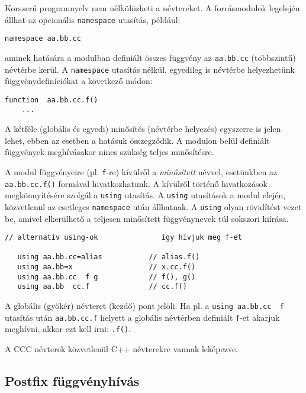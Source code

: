 Korszerű programnyelv nem nélkülözheti a névtereket.
A forrásmodulok legelején állhat az opcionális 
\verb!namespace! utasítás, például:
\begin{verbatim}
namespace aa.bb.cc
\end{verbatim}
aminek hatására a modulban definiált összes függvény
az \verb!aa.bb.cc! (többszintű) névtérbe kerül.
A \verb!namespace! utasítás nélkül, egyedileg is névtérbe 
helyezhetünk függvénydefiníciókat a következő módon:
\begin{verbatim}
function  aa.bb.cc.f()
    ...
\end{verbatim}
A kétféle (globális és egyedi) minősítés (névtérbe helyezés) 
egyszerre is jelen lehet, ebben az esetben a hatásuk összegződik.
A modulon belül definiált függvények meghívásakor
nincs szükség teljes minősítésre.

A modul függvényeire (pl. \verb!f!-re) kívülről a {\em minősített\/} névvel,
esetünkben az \verb!aa.bb.cc.f()! formával hivatkozhatunk.
A kívülről történő hivatkozások megkönnyítésére szolgál a \verb!using! utasítás.
A \verb!using! utasítások a modul elején, közvetlenül az
esetleges \verb!namespace! után állhatnak. A \verb!using! olyan 
rövidítést vezet be, amivel elkerülhető a teljesen minősített 
függvénynevek túl sokszori kiírása.

\begin{verbatim}
// alternatív using-ok               így hívjuk meg f-et

   using aa.bb.cc=alias           // alias.f()
   using aa.bb=x                  // x.cc.f()
   using aa.bb.cc  f g            // f(), g()
   using aa.bb  cc.f              // cc.f()
\end{verbatim}

A globális (gyökér) névteret (kezdő) pont jelöli. 
Ha pl. a \verb!using aa.bb.cc  f! utasítás után 
\verb!aa.bb.cc.f! helyett a globális névtérben definiált 
\verb!f!-et akarjuk meghívni, akkor ezt kell irni: \verb!.f()!.

A CCC névterek közvetlenül C++ névterekre vannak leképezve.


\subsection{Postfix függvényhívás}

